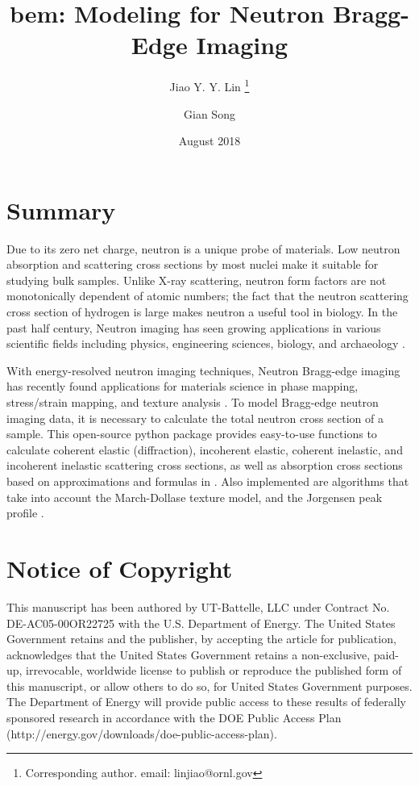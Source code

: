 \documentclass{article}
\title{bem: Modeling for Neutron Bragg-Edge Imaging}
\author[1]{Jiao Y. Y. Lin \thanks{Corresponding author. email: linjiao@ornl.gov}}
\author[1]{Gian Song}
\affil[1]{Neutron Scattering Division, Oak Ridge National Lab}
\date{August 2018}
\begin{document}
\maketitle

\section{Summary}\label{summary}
Due to its zero net charge, neutron is a unique probe of materials.
Low neutron absorption and scattering cross sections by most nuclei make it
suitable for studying bulk samples.
Unlike X-ray scattering, neutron form factors are not monotonically dependent of atomic numbers;
the fact that the neutron scattering cross section of hydrogen is large makes neutron
a useful tool in biology.
In the past half century, Neutron imaging has seen growing applications
in various scientific fields
including physics, engineering sciences, biology, and archaeology
\cite{strobl2009}.

With energy-resolved neutron imaging techniques,
Neutron Bragg-edge imaging has recently found applications for materials science in phase mapping,
stress/strain mapping, and texture analysis
\cite{lehmann2010, sato2017}.
To model Bragg-edge neutron imaging data, it is necessary to calculate
the total neutron cross section of a sample.
This open-source python package
provides easy-to-use functions to calculate coherent elastic (diffraction),
incoherent elastic, coherent inelastic, and incoherent inelastic scattering
cross sections, as well as absorption cross sections
based on approximations and formulas in \cite{vogel2000thesis}.
Also implemented are algorithms that take into account 
the March-Dollase texture model, and the Jorgensen peak profile
\cite{vogel2000thesis}.

\section{Notice of Copyright}\label{notice-of-copyright}

This manuscript has been authored by UT-Battelle, LLC under Contract No.
DE-AC05-00OR22725 with the U.S. Department of Energy. The United States
Government retains and the publisher, by accepting the article for
publication, acknowledges that the United States Government retains a
non-exclusive, paid-up, irrevocable, worldwide license to publish or
reproduce the published form of this manuscript, or allow others to do
so, for United States Government purposes. The Department of Energy will
provide public access to these results of federally sponsored research
in accordance with the DOE Public Access Plan
(http://energy.gov/downloads/doe-public-access-plan).
\end{document}
